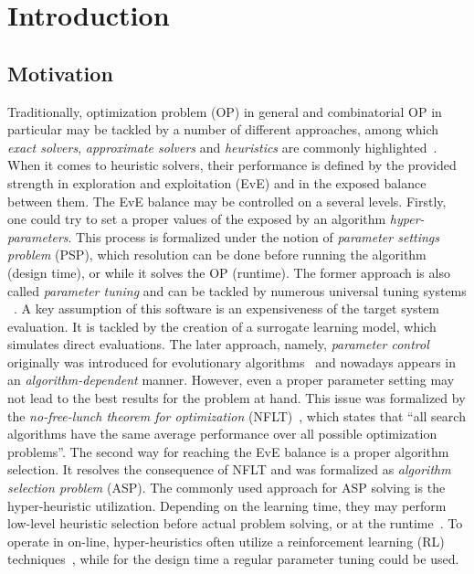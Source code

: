 \chapter{Introduction}\label{intro}

\section{Motivation}
Traditionally, optimization problem (OP) in general and combinatorial OP in particular may be tackled by a number of different approaches, among which \emph{exact solvers}, \emph{approximate solvers} and \emph{heuristics} are commonly highlighted~\cite{junger2003combinatorial,biegler2004retrospective,festa2014brief}. When it comes to heuristic solvers, their performance is defined by the provided strength in exploration and exploitation (EvE) and in the exposed balance between them. The EvE balance may be controlled on a several levels. Firstly, one could try to set a proper values of the exposed by an algorithm \emph{hyper-parameters}. This process is formalized under the notion of \emph{parameter settings problem} (PSP), which resolution can be done before running the algorithm (design time), or while it solves the OP (runtime). The former approach is also called \emph{parameter tuning} and can be tackled by numerous universal tuning systems ~\cite{hutter2009paramils,hutter2011sequential,lopez2016irace,falkner2018bohb,brise2spl}. A key assumption of this software is an expensiveness of the target system evaluation. It is tackled by the creation of a surrogate learning model, which simulates direct evaluations. The later approach, namely, \emph{parameter control} originally was introduced for evolutionary algorithms~\cite{karafotias2014parameter} and nowadays appears in an \emph{algorithm-dependent} manner. However, even a proper parameter setting may not lead to the best results for the problem at hand. This issue was formalized by the \emph{no-free-lunch theorem for optimization} (NFLT)~\cite{wolpert1997no}, which states that ``all search algorithms have the same average performance over all possible optimization problems''. The second way for reaching the EvE balance is a proper algorithm selection. It resolves the consequence of NFLT and was formalized as \emph{algorithm selection problem} (ASP). The commonly used approach for ASP solving is the hyper-heuristic utilization. Depending on the learning time, they may perform low-level heuristic selection before actual problem solving, or at the runtime~\cite{burke2019classification}. To operate in on-line, hyper-heuristics often utilize a reinforcement learning (RL) techniques~\cite{moriarty1999evolutionary,mcclymont2011markov}, while for the design time a regular parameter tuning could be used.

